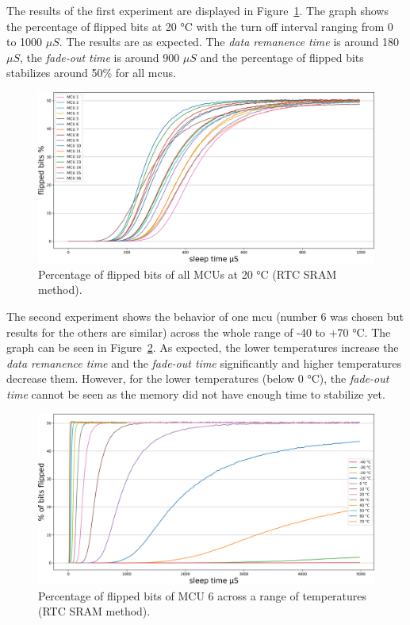 The results of the first experiment are displayed in Figure~\ref{fig:all_plus_20_rtc}. The graph shows the percentage of flipped bits at 20 °C with the turn off interval ranging from 0 to 1000 $\mu{}S$. The results are as expected. The \emph{data remanence time} is around 180 $\mu{}S$, the \emph{fade-out time} is around 900 $\mu{}S$ and the percentage of flipped bits stabilizes around 50\% for all \glspl{mcu}.

\begin{figure}[ht!]
    \centering
    \captionsetup{justification=centering,margin=0.5cm}
    \includegraphics[width=\textwidth]{images/all_plus_20_rtc.png}
    \caption{Percentage of flipped bits of all MCUs at 20 °C (RTC SRAM method).}
    \label{fig:all_plus_20_rtc}
\end{figure}


The second experiment shows the behavior of one \gls{mcu} (number 6 was chosen but results for the others are similar) across the whole range of -40 to +70 °C. The graph can be seen in Figure~\ref{fig:6_across_temps_rtc}. As expected, the lower temperatures increase the \emph{data remanence time} and the \emph{fade-out time} significantly and higher temperatures decrease them. However, for the lower temperatures (below 0 °C), the \emph{fade-out time} cannot be seen as the memory did not have enough time to stabilize yet. 

\begin{figure}[ht!]
    \centering
    \captionsetup{justification=centering,margin=0.5cm}
    \includegraphics[width=\textwidth]{images/6_across_temps_rtc.png}
    \caption{Percentage of flipped bits of MCU 6 across a range of temperatures (RTC SRAM method).}
    \label{fig:6_across_temps_rtc}
\end{figure}

